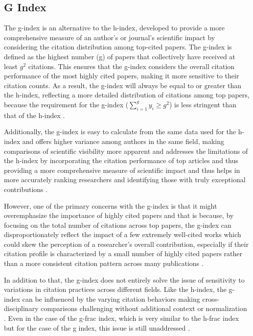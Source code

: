 \subsection{G Index}
The g-index is an alternative to the h-index, developed to provide a more
comprehensive measure of an author's or journal's scientific impact by
considering the citation distribution among top-cited papers. The g-index is
defined as the highest number (g) of papers that collectively have received at
least $g^2$ citations. This ensures that the g-index considers the overall
citation performance of the most highly cited papers, making it more sensitive
to their citation counts. As a result, the g-index will always be equal to or
greater than the h-index, reflecting a more detailed distribution of citations
among top papers, because the requirement for the g-index ($\sum_{i=1}^{g} y_i
    \geq g^2$) is less stringent than that of the h-index
\cite{egghe2008mathematical, egghe2006improvement}.

Additionally, the g-index is easy to calculate from the same data used for the
h-index and offers higher variance among authors in the same field, making
comparisons of scientific visibility more apparent and addresses the
limitations of the h-index by incorporating the citation performance of top
articles and thus providing a more comprehensive measure of scientific impact
and thus helps in more accurately ranking researchers and identifying those
with truly exceptional contributions \cite{egghe2008mathematical,
    egghe2006theory, egghe2006improvement}.

However, one of the primary concerns with the g-index is that it might
overemphasize the importance of highly cited papers and that is because, by
focusing on the total number of citations across top papers, the g-index can
disproportionately reflect the impact of a few extremely well-cited works which
could skew the perception of a researcher's overall contribution, especially if
their citation profile is characterized by a small number of highly cited
papers rather than a more consistent citation pattern across many publications
\cite{egghe2008mathematical}.

In addition to that, the g-index does not entirely solve the issue of
sensitivity to variations in citation practices across different fields. Like
the h-index, the g-index can be influenced by the varying citation behaviors
making cross-disciplinary comparisons challenging without additional context or
normalization \cite{egghe2008mathematical, egghe2006theory,
    egghe2006improvement}. Even in the case of the g-frac index, which is very
similar to the h-frac index but for the case of the g index, this issue is
still unaddressed \cite{egghe2008mathematical}.

